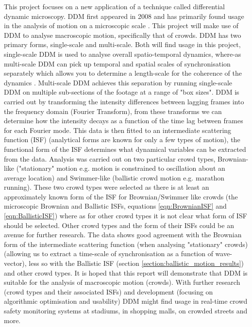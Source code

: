 \documentclass[10pt]{article}
\begin{document}
This project focuses on a new application of a technique called differential dynamic microscopy. DDM first appeared in 2008 \cite{ddm0} and has primarily found usage in the analysis of motion on a microscopic scale \cite{ddm1}. This project will make use of DDM to analyse macroscopic motion, specifically that of crowds. DDM has two primary forms, single-scale and multi-scale. Both will find usage in this project, single-scale DDM is used to analyse overall spatio-temporal dynamics, where-as multi-scale DDM can pick up temporal and spatial scales of synchronisation separately which allows you to determine a length-scale for the coherence of the dynamics \cite{ddm1}. Multi-scale DDM achieves this separation by running single-scale DDM on multiple sub-sections of the footage at a range of "box sizes". DDM is carried out by transforming the intensity differences between lagging frames into the frequency domain (Fourier Transform), from these transforms we can determine how the intensity decays as a function of the time lag between frames for each Fourier mode. This data is then fitted to an intermediate scattering function (ISF) (analytical forms are known for only a few types of motion), the functional form of the ISF determines what dynamical variables can be extracted from the data. Analysis was carried out on two particular crowd types, Brownian-like ("stationary" motion e.g. motion is constrained to oscillation about an average location) and Swimmer-like (ballistic crowd motion e.g. marathon running). These two crowd types were selected as there is at least an approximately known form of the ISF for Brownian/Swimmer like crowds (the microscopic Brownian and Ballistic ISFs, equations \ref{eqn:BrownianISF} and \ref{eqn:BallisticISF}) where as for other crowd types it is not clear what form of ISF should be selected. Other crowd types and the form of their ISFs could be an avenue for further research. The data shows good agreement with the Brownian form of the intermediate scattering function (when analysing "stationary" crowds) (allowing us to extract a time-scale of synchronisation as a function of wave-vector), less so with the Ballistic ISF (section \ref{section:ballistic_motion_results}) and other crowd types. It is hoped that this report will demonstrate that DDM is suitable for the analysis of macroscopic motion (crowds). With further research (crowd types and their associated ISFs) and development (focusing on algorithmic optimisation and usability) DDM might find usage in real-time crowd safety monitoring systems at stadiums, in shopping malls, on crowded streets and more.
\end{document}
